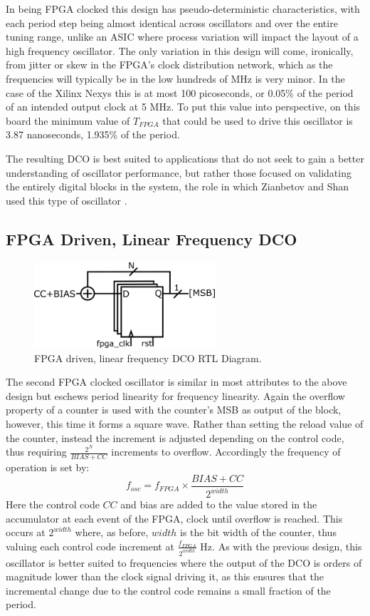 In being \ac{FPGA} clocked this design has pseudo-deterministic characteristics, with each period step being almost identical across oscillators and over the entire tuning range, unlike an \ac{ASIC} where process variation will impact the layout of a high frequency oscillator. The only variation in this design will come, ironically, from jitter or skew in the \ac{FPGA}'s clock distribution network, which as the frequencies will typically be in the low hundreds of MHz is very minor. In the case of the Xilinx \acl*{Nexys} this is at most 100 picoseconds, or 0.05\% of the period of an intended output clock at 5 MHz. To put this value into perspective, on this board the minimum value of $T_{FPGA}$ that could be used to drive this oscillator is 3.87 nanoseconds, 1.935\% of the period.

The resulting \ac{DCO} is best suited to applications that do not seek to gain a better understanding of oscillator performance, but rather those focused on validating the entirely digital blocks in the system, the role in which Zianbetov and Shan used this type of oscillator \cite{zianbetov2013phd,shan2014phd}.

\subsection{\acs{FPGA} Driven, Linear Frequency \acs{DCO}}
\begin{figure}[h]
	\centering
	\includegraphics[width=0.6\textwidth]{../osc2}
	\caption{\acs{FPGA} driven, linear frequency \acs{DCO} \ac{RTL} Diagram.}
	\label{fig:osc2}
\end{figure}
The second \ac{FPGA} clocked oscillator is similar in most attributes to the above design but eschews period linearity for frequency linearity. Again the overflow property of a counter is used with the counter's \ac{MSB} as output of the block, however, this time it forms a square wave. Rather than setting the reload value of the counter, instead the increment is adjusted depending on the control code, thus requiring $\frac{2^N}{BIAS+CC}$ increments to overflow. Accordingly the frequency of operation is set by:
\begin{equation}
	f_{osc} = f_{FPGA}\times\frac{BIAS+CC}{2^{width}}
\end{equation}
Here the control code $CC$ and bias are added to the value stored in the accumulator at each event of the \ac{FPGA}, clock until overflow is reached. This occurs at $2^{width}$ where, as before, $width$ is the bit width of the counter, thus valuing each control code increment at $\frac{f_{FPGA}}{2^{width}}$ Hz. As with the previous design, this oscillator is better suited to frequencies where the output of the \ac{DCO} is orders of magnitude lower than the clock signal driving it, as this ensures that the incremental change due to the control code remains a small fraction of the period.

